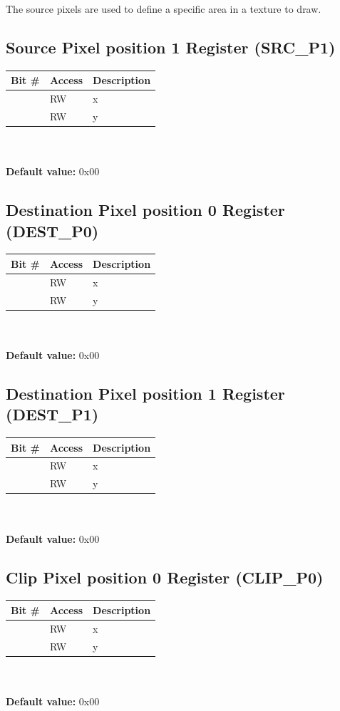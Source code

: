 \documentclass[10pt,a4paper]{article}
\begin{document}
The source pixels are used to define a specific area in a texture to draw.

\subsection{Source Pixel position 1 Register (SRC\_P1)}
\begin{tabular}{|l|l|l|}
\hline \textbf{Bit \#} & \textbf{Access} & \textbf{Description} \\ 
\hline
\hline [31:16] & RW & x \\
\hline [15:0] & RW & y \\
\hline 
\end{tabular}
\\\\
\textbf{Default value:} 0x00

\subsection{Destination Pixel position 0 Register (DEST\_P0)}
\begin{tabular}{|l|l|l|}
\hline \textbf{Bit \#} & \textbf{Access} & \textbf{Description} \\ 
\hline
\hline [31:16] & RW & x \\
\hline [15:0] & RW & y \\
\hline 
\end{tabular}
\\\\
\textbf{Default value:} 0x00

\subsection{Destination Pixel position 1 Register (DEST\_P1)}
\begin{tabular}{|l|l|l|}
\hline \textbf{Bit \#} & \textbf{Access} & \textbf{Description} \\ 
\hline
\hline [31:16] & RW & x \\
\hline [15:0] & RW & y \\
\hline 
\end{tabular}
\\\\
\textbf{Default value:} 0x00

\subsection{Clip Pixel position 0 Register (CLIP\_P0)}
\begin{tabular}{|l|l|l|}
\hline \textbf{Bit \#} & \textbf{Access} & \textbf{Description} \\ 
\hline
\hline [31:16] & RW & x \\
\hline [15:0] & RW & y \\
\hline 
\end{tabular}
\\\\
\textbf{Default value:} 0x00
\end{document}
